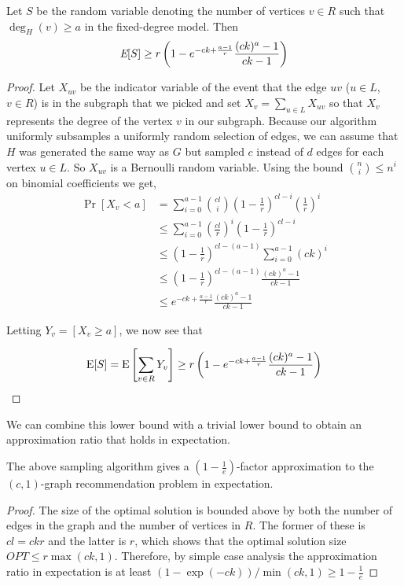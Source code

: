 \begin{thm}\label{original_result}
Let $S$ be the
random variable denoting the number of vertices $v \in R$ such that
$\deg_{H}(v)\geq a$ in the fixed-degree model. Then
\[ \emph{\text{E}}[S] \geq r\left(1-e^{-ck+\frac{a-1}{r}}\frac{(ck)^a-1}{ck-1}\right)  \]
\end{thm}

\begin{proof}
Let $X_{uv}$ be the indicator variable of the event that the edge $uv$
($u\in L$, $v\in R$) is in the subgraph that we picked
and set $X_{v} = \sum_{u\in L} X_{uv}$ so that $X_{v}$ represents the
degree of the vertex $v$ in our subgraph. Because our algorithm
uniformly subsamples a uniformly random selection of edges, we can
assume that $H$ was generated the same way as $G$ but sampled $c$
instead of $d$ edges for each vertex $u\in L$. So $X_{uv}$ is a
Bernoulli random variable. Using the bound $\binom{n}{i}
\leq n^i$ on binomial coefficients we get,
\begin{align*}
      \Pr[X_v < a]
&=    \sum_{i=0}^{a-1} \binom{cl}{i} \left(1-\frac{1}{r}\right)^{cl-i}\left(\frac{1}{r}\right)^i \\
&\leq \sum_{i=0}^{a-1} \left(\frac{cl}{r}\right)^i\left(1-\frac{1}{r}\right)^{cl-i} \\
&\leq    \left(1-\frac{1}{r}\right)^{cl-(a-1)} \sum_{i=0}^{a-1} (ck)^i \\
&\leq \left(1-\frac{1}{r}\right)^{cl-(a-1)}\frac{(ck)^a-1}{ck-1} \\
&\leq e^{-ck+\frac{a-1}{r}} \frac{(ck)^a-1}{ck-1}
\end{align*}


Letting $Y_v = \left[X_v \geq a\right]$, we now see that

\[ \text{E}[S] = \text{E}\left[\sum_{v\in R} Y_v\right] \geq r\left(1-e^{-ck+\frac{a-1}{r}} \frac{(ck)^a-1}{ck-1}\right) \]
\end{proof}

We can combine this lower bound with a trivial lower bound to obtain an
approximation ratio that holds in expectation.

\begin{thm}
The above sampling algorithm gives a $\left(1-\frac1e\right)$-factor approximation to the $(c,1)$-graph recommendation problem in expectation.
\end{thm}
\begin{proof}
The size of the optimal solution is bounded above by both the number
of edges in the graph and the number of vertices in $R$. The former of
these is $cl=ckr$ and the latter is $r$, which shows that the optimal solution size
$OPT \leq
r\max(ck,1)$. Therefore, by simple case analysis the approximation ratio
in expectation is at least
$ ({1-\exp(-ck)})/\min(ck,1) \geq 1-\frac{1}{e} $
\end{proof}


